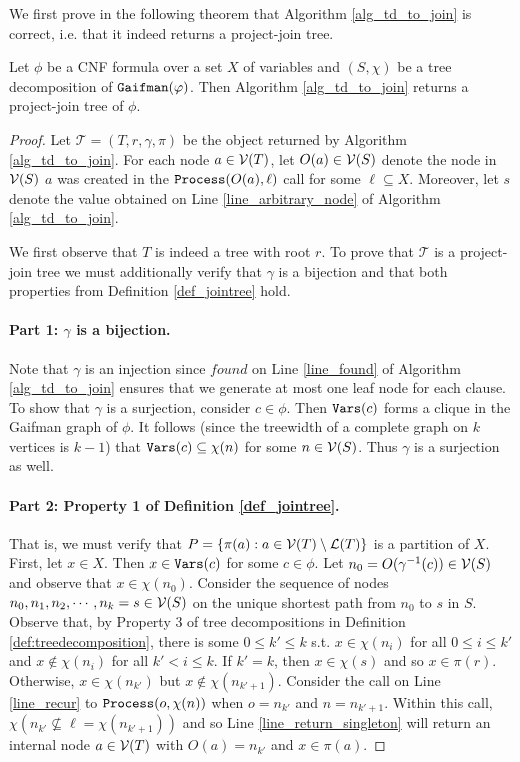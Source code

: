 We first prove in the following theorem that Algorithm \ref{alg_td_to_join} is correct, i.e. that it indeed returns a project-join tree. 
\begin{theorem}
\label{thm_td_to_join_correct}
	Let $\phi$ be a CNF formula over a set $X$ of variables and $(S, \chi)$ be a tree decomposition of $\texttt{\upshape Gaifman}(\varphi)$.
    Then Algorithm \ref{alg_td_to_join} returns a project-join tree of $\phi$.
\end{theorem}
\begin{proof}
Let $\mathcal{T} = (T, r, \gamma, \pi)$ be the object returned by Algorithm \ref{alg_td_to_join}. For each node $a \in \mathcal{V}(T)$, let $O(a) \in \mathcal{V}(S)$ denote the node in $\mathcal{V}(S)$ \st{} $a$ was created in the $\texttt{\upshape Process}(O(a), \ell)$ call for some $\ell \subseteq X$. Moreover, let $s$ denote the value obtained on Line \ref{line_arbitrary_node} of Algorithm \ref{alg_td_to_join}.

We first observe that $T$ is indeed a tree with root $r$. To prove that $\mathcal{T}$ is a project-join tree we must additionally verify that $\gamma$ is a bijection and that both properties from Definition \ref{def_jointree} hold.  

\paragraph{Part 1: $\gamma$ is a bijection.}
    Note that $\gamma$ is an injection since $found$ on Line \ref{line_found} of Algorithm \ref{alg_td_to_join} ensures that we generate at most one leaf node for each clause.
    To show that $\gamma$ is a surjection, consider $c \in \phi$.
    Then $\texttt{\upshape Vars}(c)$ forms a clique in the Gaifman graph of $\phi$.
    It follows (since the treewidth of a complete graph on $k$ vertices is $k-1$) that $\texttt{\upshape Vars}(c) \subseteq \chi(n)$ for some $n \in \mathcal{V}(S)$.
    Thus $\gamma$ is a surjection as well.
    
\paragraph{Part 2: Property 1 of Definition \ref{def_jointree}.} 
    That is, we must verify that $P = \{\pi(a) : a \in \mathcal{V}(T) \setminus \mathcal{L}(T) \}$ is a partition of $X$.
    First, let $x \in X$.
    Then $x \in \texttt{\upshape Vars}(c)$ for some $c \in \phi$. 
    Let $n_0 = O(\gamma^{-1}(c)) \in \mathcal{V}(S)$ and observe that $x \in \chi(n_0)$.
    Consider the sequence of nodes $n_0, n_1, n_2, \cdots, n_k = s \in \mathcal{V}(S)$ on the unique shortest path from $n_0$ to $s$ in $S$.
    Observe that, by Property 3 of tree decompositions in Definition \ref{def:treedecomposition}, there is some $0 \leq k' \leq k$ s.t. $x \in \chi(n_i)$ for all $0 \leq i \leq k'$ and $x \not \in \chi(n_i)$ for all $k' < i \leq k$.
    If $k' = k$, then $x \in \chi(s)$ and so $x \in \pi(r)$.
    Otherwise,  $x \in \chi(n_{k'})$ but $x \not\in \chi(n_{k'+1})$.
    Consider the call on Line \ref{line_recur} to $\texttt{\upshape Process}(o, \chi(n))$ when $o = n_{k'}$ and $n = n_{k'+1}$.
    Within this call, $\chi(n_{k'} \not\subseteq \ell = \chi(n_{k'+1}))$ and so Line \ref{line_return_singleton} will return an internal node $a \in \mathcal{V}(T)$ with $O(a) = n_{k'}$ and $x \in \pi(a)$.


\end{proof}
